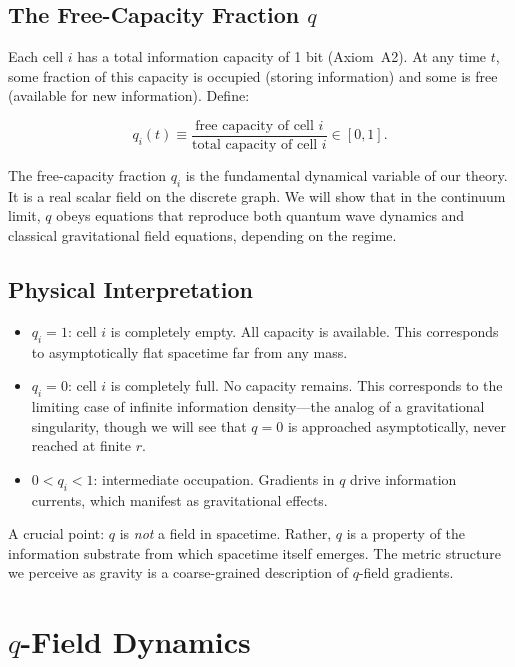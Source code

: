 \documentclass[aps,prd,twocolumn,showpacs,superscriptaddress,preprintnumbers]{revtex4-2}
\begin{document}
\subsection{The Free-Capacity Fraction $q$}

Each cell $i$ has a total information capacity of 1 bit (Axiom~A2).
At any time $t$, some fraction of this capacity is occupied (storing information) and some is free (available for new information).
Define:

\begin{equation}
q_i(t) \equiv \frac{\text{free capacity of cell } i}{\text{total capacity of cell } i} \in [0, 1].
\label{eq:qdef}
\end{equation}

The free-capacity fraction $q_i$ is the fundamental dynamical variable of our theory.
It is a real scalar field on the discrete graph.
We will show that in the continuum limit, $q$ obeys equations that reproduce both quantum wave dynamics and classical gravitational field equations, depending on the regime.

\subsection{Physical Interpretation}

\begin{itemize}
    \item $q_i = 1$: cell $i$ is completely empty. All capacity is available. This corresponds to asymptotically flat spacetime far from any mass.
    \item $q_i = 0$: cell $i$ is completely full. No capacity remains. This corresponds to the limiting case of infinite information density---the analog of a gravitational singularity, though we will see that $q=0$ is approached asymptotically, never reached at finite $r$.
    \item $0 < q_i < 1$: intermediate occupation. Gradients in $q$ drive information currents, which manifest as gravitational effects.
\end{itemize}

A crucial point: $q$ is \emph{not} a field in spacetime.
Rather, $q$ is a property of the information substrate from which spacetime itself emerges.
The metric structure we perceive as gravity is a coarse-grained description of $q$-field gradients.

\section{$q$-Field Dynamics}
\label{sec:dynamics}
\end{document}
